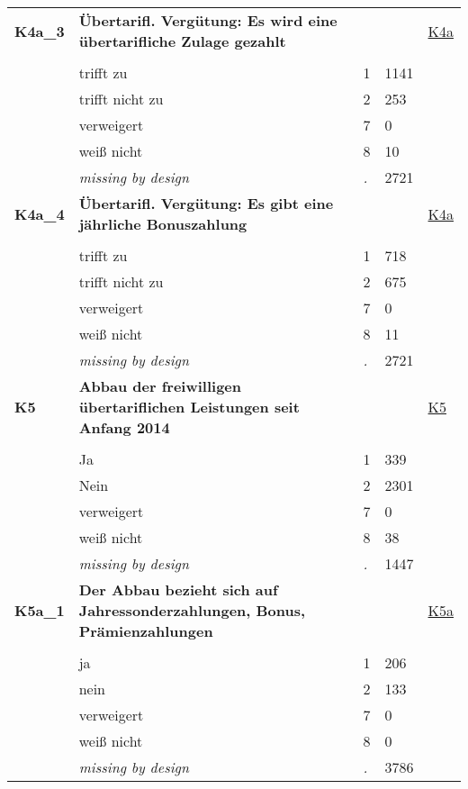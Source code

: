\begin{longtable}{| L{2.65cm} | L{8cm} | C{1.5cm} | R{1.25cm} | C{2.25cm}  |}
   \midrule
\textbf{K4a\_3}\label{var:K4a:3} & \textbf{Übertarifl. Vergütung: Es wird eine übertarifliche Zulage gezahlt} &  &  & \hyperref[K4a]{K4a} \\ 
   &  &  &  &  \\ 
   & trifft zu & 1 & 1141 &  \\ 
   & trifft nicht zu & 2 & 253 &  \\ 
   & verweigert & 7 & 0 &  \\ 
   & weiß nicht & 8 & 10 &  \\ 
   & \textit{missing by design} & \textit{.} & 2721 &  \\ 
   \midrule
\textbf{K4a\_4}\label{var:K4a:4} & \textbf{Übertarifl. Vergütung: Es gibt eine jährliche Bonuszahlung} &  &  & \hyperref[K4a]{K4a} \\ 
   &  &  &  &  \\ 
   & trifft zu & 1 & 718 &  \\ 
   & trifft nicht zu & 2 & 675 &  \\ 
   & verweigert & 7 & 0 &  \\ 
   & weiß nicht & 8 & 11 &  \\ 
   & \textit{missing by design} & \textit{.} & 2721 &  \\ 
   \midrule
\textbf{K5}\label{var:K5} & \textbf{Abbau der freiwilligen übertariflichen Leistungen seit Anfang 2014} &  &  & \hyperref[K5]{K5} \\ 
   &  &  &  &  \\ 
   & Ja & 1 & 339 &  \\ 
   & Nein & 2 & 2301 &  \\ 
   & verweigert & 7 & 0 &  \\ 
   & weiß nicht & 8 & 38 &  \\ 
   & \textit{missing by design} & \textit{.} & 1447 &  \\ 
   \midrule
\textbf{K5a\_1}\label{var:K5a:1} & \textbf{Der Abbau bezieht sich auf Jahressonderzahlungen, Bonus, Prämienzahlungen} &  &  & \hyperref[K5a]{K5a} \\ 
   &  &  &  &  \\ 
   & ja & 1 & 206 &  \\ 
   & nein & 2 & 133 &  \\ 
   & verweigert & 7 & 0 &  \\ 
   & weiß nicht & 8 & 0 &  \\ 
   & \textit{missing by design} & \textit{.} & 3786 &  \\ 
   \midrule

\end{longtable}
